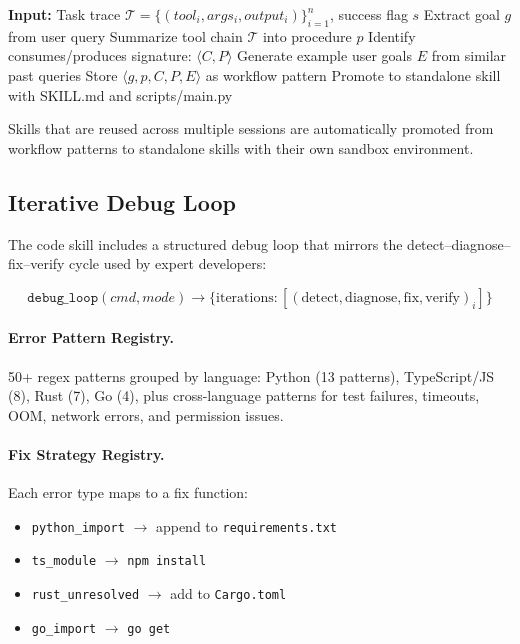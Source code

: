 \documentclass[11pt,a4paper]{article}
\begin{document}
\begin{algorithm}[t]
    \caption{Skill Distillation}
    \label{alg:distill}
    \begin{algorithmic}[1]
    \State \textbf{Input:} Task trace $\mathcal{T} = \{(tool_i, args_i, output_i)\}_{i=1}^n$, success flag $s$
     \Return \EndIf
    \State Extract goal $g$ from user query
    \State Summarize tool chain $\mathcal{T}$ into procedure $p$
    \State Identify consumes/produces signature: $\langle C, P \rangle$
    \State Generate example user goals $E$ from similar past queries
    \State Store $\langle g, p, C, P, E \rangle$ as workflow pattern
    \State Promote to standalone skill with SKILL.md and scripts/main.py
    \EndIf
    \end{algorithmic}
\end{algorithm}

Skills that are reused across multiple sessions are automatically promoted 
from workflow patterns to standalone skills with their own sandbox environment.

\subsection{Iterative Debug Loop}

The code skill includes a structured debug loop 
that mirrors the detect--diagnose--fix--verify cycle used by expert developers:

\[
\texttt{debug\_loop}(cmd, mode) \rightarrow \{\text{iterations}: [(\text{detect}, \text{diagnose}, \text{fix}, \text{verify})_i]\}
\]

\paragraph{Error Pattern Registry.}
50+ regex patterns grouped by language:
Python (13 patterns), TypeScript/JS (8), Rust (7), Go (4), 
plus cross-language patterns for test failures, timeouts, OOM, 
network errors, and permission issues.

\paragraph{Fix Strategy Registry.}
Each error type maps to a fix function:
\begin{itemize}
    \item \texttt{python\_import} $\rightarrow$ append to \texttt{requirements.txt}
    \item \texttt{ts\_module} $\rightarrow$ \texttt{npm install}
    \item \texttt{rust\_unresolved} $\rightarrow$ add to \texttt{Cargo.toml}
    \item \texttt{go\_import} $\rightarrow$ \texttt{go get}
\end{itemize}
\end{document}
